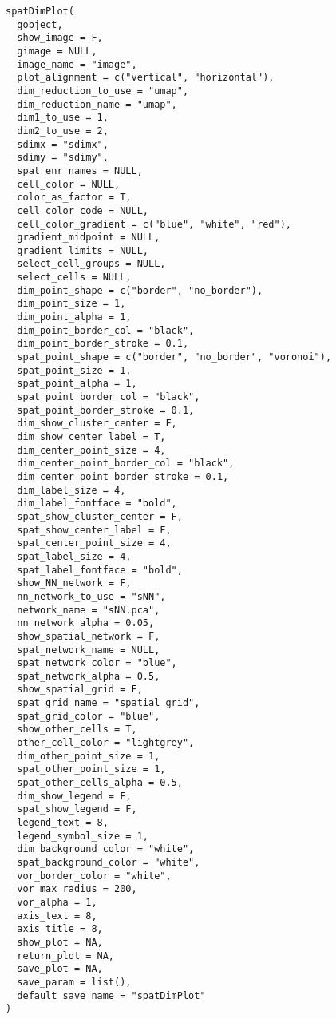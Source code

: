 \documentclass[a4paper]{book}
\begin{document}
\begin{Usage}
\begin{verbatim}
spatDimPlot(
  gobject,
  show_image = F,
  gimage = NULL,
  image_name = "image",
  plot_alignment = c("vertical", "horizontal"),
  dim_reduction_to_use = "umap",
  dim_reduction_name = "umap",
  dim1_to_use = 1,
  dim2_to_use = 2,
  sdimx = "sdimx",
  sdimy = "sdimy",
  spat_enr_names = NULL,
  cell_color = NULL,
  color_as_factor = T,
  cell_color_code = NULL,
  cell_color_gradient = c("blue", "white", "red"),
  gradient_midpoint = NULL,
  gradient_limits = NULL,
  select_cell_groups = NULL,
  select_cells = NULL,
  dim_point_shape = c("border", "no_border"),
  dim_point_size = 1,
  dim_point_alpha = 1,
  dim_point_border_col = "black",
  dim_point_border_stroke = 0.1,
  spat_point_shape = c("border", "no_border", "voronoi"),
  spat_point_size = 1,
  spat_point_alpha = 1,
  spat_point_border_col = "black",
  spat_point_border_stroke = 0.1,
  dim_show_cluster_center = F,
  dim_show_center_label = T,
  dim_center_point_size = 4,
  dim_center_point_border_col = "black",
  dim_center_point_border_stroke = 0.1,
  dim_label_size = 4,
  dim_label_fontface = "bold",
  spat_show_cluster_center = F,
  spat_show_center_label = F,
  spat_center_point_size = 4,
  spat_label_size = 4,
  spat_label_fontface = "bold",
  show_NN_network = F,
  nn_network_to_use = "sNN",
  network_name = "sNN.pca",
  nn_network_alpha = 0.05,
  show_spatial_network = F,
  spat_network_name = NULL,
  spat_network_color = "blue",
  spat_network_alpha = 0.5,
  show_spatial_grid = F,
  spat_grid_name = "spatial_grid",
  spat_grid_color = "blue",
  show_other_cells = T,
  other_cell_color = "lightgrey",
  dim_other_point_size = 1,
  spat_other_point_size = 1,
  spat_other_cells_alpha = 0.5,
  dim_show_legend = F,
  spat_show_legend = F,
  legend_text = 8,
  legend_symbol_size = 1,
  dim_background_color = "white",
  spat_background_color = "white",
  vor_border_color = "white",
  vor_max_radius = 200,
  vor_alpha = 1,
  axis_text = 8,
  axis_title = 8,
  show_plot = NA,
  return_plot = NA,
  save_plot = NA,
  save_param = list(),
  default_save_name = "spatDimPlot"
)
\end{verbatim}
\end{Usage}
%
\end{document}
